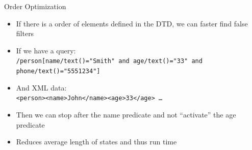 \documentclass[mathserif,serif]{beamer}
\begin{document}
\begin{frame}{Order Optimization}
  \begin{itemize}
    \item If there is a order of elements defined in the DTD, we can faster find false filters
    \item If we have a query: \\\texttt{/person[name/text()="Smith" and age/text()="33" and phone/text()="5551234"]}
    \item And XML data: \\\texttt{<person><name>John</name><age>33</age> \dots}
    \item Then we can stop after the name predicate and not ``activate'' the age predicate
    \item Reduces average length of states and thus run time 
  \end{itemize}
\end{frame}
\end{document}
